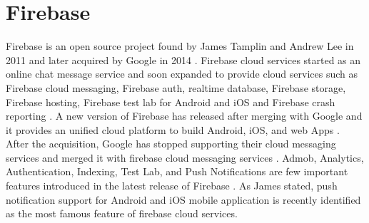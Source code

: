 \section{Firebase}

Firebase is an open source project found by James Tamplin and Andrew Lee in 2011
and later acquired by Google in 2014 \cite{hid-sp18-409-www-firebase}. Firebase
cloud services started as an online chat message service and soon expanded to
provide cloud services such as Firebase cloud messaging, Firebase auth, realtime
database, Firebase storage, Firebase hosting, Firebase test lab for Android and
iOS and Firebase crash reporting \cite{hid-sp18-409-www-firebase-official}. A
new version of Firebase has released after merging with Google and it provides
an unified cloud platform to build Android, iOS, and web Apps
\cite{hid-sp18-409-www-firebase-official}. After the acquisition, Google has
stopped supporting their cloud messaging services and merged it with firebase
cloud messaging services \cite{hid-sp18-409-www-firebase-merged}. Admob,
Analytics, Authentication, Indexing, Test Lab, and Push Notifications are few
important features introduced in the latest release of Firebase
\cite{hid-sp18-409-www-firebase-official}. As James
\cite{hid-sp18-409-www-firebase} stated, push notification support for Android
and iOS mobile application is recently identified as the most famous feature of
firebase cloud services.
